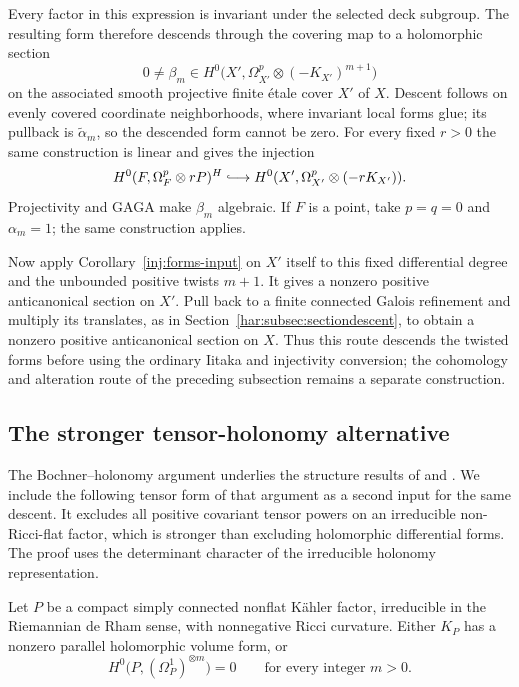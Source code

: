 Every factor in this expression is invariant under the selected
deck subgroup.  The resulting form therefore descends through the
covering map to a holomorphic section
\[
 0\ne\beta_m\in
 H^0\bigl(X',\Omega_{X'}^{p}\otimes(-K_{X'})^{m+1}\bigr)
\]
on the associated smooth projective finite \'etale cover $X'$ of
$X$.  Descent follows on evenly covered coordinate neighborhoods,
where invariant local forms glue; its pullback is
$\widetilde\alpha_m$, so the descended form cannot be zero.
For every fixed $r>0$ the same construction is linear and gives
the injection
\[
 H^0(F,\Omega_F^p\otimes rP)^H
 \lhook\joinrel\longrightarrow
 H^0(X',\Omega_{X'}^p\otimes(-rK_{X'})).
\]
Projectivity and GAGA make $\beta_m$ algebraic.  If $F$ is a point,
take $p=q=0$ and $\alpha_m=1$; the same construction applies.

Now apply Corollary~\ref{inj:forms-input} on $X'$ itself to this
fixed differential degree and the unbounded positive twists $m+1$.
It gives a nonzero positive anticanonical section on $X'$.  Pull back
to a finite connected Galois refinement and multiply its translates,
as in Section~\ref{har:subsec:sectiondescent}, to obtain a nonzero
positive anticanonical section on $X$.  Thus this route descends the
twisted forms before using the ordinary Iitaka and injectivity
conversion; the cohomology and alteration route of the preceding
subsection remains a separate construction.

\subsection{The stronger tensor-holonomy alternative}
The Bochner--holonomy argument underlies the structure results of
\cite[Sections~2--3]{DPS1996} and
\cite[proof of Theorem~1.4]{CDP2015}. We include the following tensor
form of that argument as a second input for the same descent. It
excludes all positive covariant tensor powers on an irreducible
non-Ricci-flat factor, which is stronger than excluding holomorphic
differential forms. The proof uses the determinant character of the
irreducible holonomy representation.

\begin{proposition}
\label{prop:tensor-holonomy}
Let $P$ be a compact simply connected nonflat K\"ahler factor,
irreducible in the Riemannian de Rham sense, with nonnegative Ricci
curvature.  Either $K_P$ has a nonzero
parallel holomorphic volume form, or
\[
 H^0\bigl(P,(\Omega_P^1)^{\otimes m}\bigr)=0
 \qquad\text{for every integer }m>0.
\]
\end{proposition}


